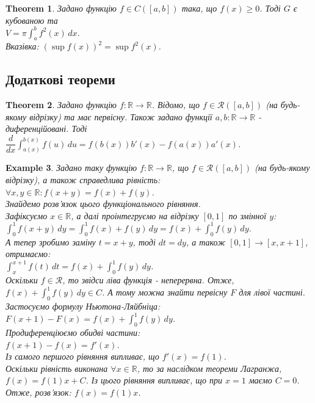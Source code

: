 \documentclass[a4paper, 10pt]{article}
\def\huge{\displaystyle}
\theoremstyle{theoremdd}
\newtheorem{theorem}{Theorem}[subsection]
\theoremstyle{theoremdd}
\theoremstyle{theoremdd}
\theoremstyle{theoremdd}
\theoremstyle{theoremdd}
\newtheorem{example}[theorem]{Example}
\theoremstyle{theoremdd}
\theoremstyle{theoremdd}
\theoremstyle{theoremdd}
\theoremstyle{theoremdd}
\begin{document}
\begin{theorem}
Задано функцію $f \in C([a,b])$ така, що $f(x) \geq 0$. Тоді $G$ є кубованою та \\ $V = \pi \huge\int_a^b f^2(x)\,dx$.\\
\textit{Вказівка: $\huge (\sup f(x))^2 = \sup f^2 (x)$.}
\end{theorem}
\newpage

\iffalse
\subsection{Додаткові теореми}
\begin{theorem}
Задано функцію $f: \mathbb{R} \to \mathbb{R}$. Відомо, що $f \in \mathcal{R}([a,b])$ (на будь-якому відрізку) та має первісну. Також задано функції $a,b: \mathbb{R} \to \mathbb{R}$ - диференційовані. Тоді\\
$\dfrac{d}{dx} \huge\int_{a(x)}^{b(x)}f(u)\,du = f(b(x))b'(x) - f(a(x))a'(x)$.
\end{theorem}

\begin{example}
Задано таку функцію $f: \mathbb{R} \to \mathbb{R}$, що $f \in \mathcal{R}([a,b])$ (на будь-якому відрізку), а також справедлива рівність:\\
$\forall x,y \in \mathbb{R}: f(x+y) = f(x) + f(y)$.\\
Знайдемо розв'язок цього функціонального рівняння.\\
Зафіксуємо $x \in \mathbb{R}$, а далі проінтегруємо на відрізку $[0,1]$ по змінної $y$:\\
$\huge\int_0^1 f(x+y)\,dy = \int_0^1 f(x)+f(y)\,dy = f(x) + \int_0^1 f(y)\,dy$.\\
А тепер зробимо заміну $t = x+y$, тоді $dt = dy$, а також $[0,1] \to [x,x+1]$, отримаємо:\\
$\huge\int_x^{x+1} f(t)\,dt = f(x) + \int_0^1 f(y)\,dy$.\\
Оскільки $f \in \mathcal{R}$, то звідси ліва функція - неперервна. Отже, $\huge f(x) + \int_0^1 f(y)\,dy \in C$. А тому можна знайти первісну $F$ для лівої частині. Застосуємо формулу Ньютона-Ляйбніца:\\
$F(x+1) - F(x) = f(x) + \huge\int_0^1 f(y)\,dy$.\\
Продиференціюємо обидві частини:\\
$f(x+1) - f(x) = f'(x)$.\\
Із самого першого рівняння випливає, що $f'(x) = f(1)$.\\
Оскільки рівність виконана $\forall x \in \mathbb{R}$, то за наслідком теореми Лагранжа, $f(x) = f(1)x + C$. Із цього рівняння випливає, що при $x = 1$ маємо $C = 0$.\\
Отже, розв'язок: $f(x) = f(1)x$.
\end{example}
\end{document}

